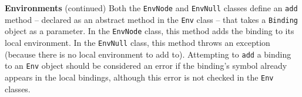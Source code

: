 \begin{minipage}[t]{\sw}
\slidenumber
\LARGE
{\bf Environments} (continued)\exx
Both the \verb'EnvNode' and \verb'EnvNull' classes
define an \verb'add' method --
declared as an abstract method in the \verb'Env' class --
that takes a \verb'Binding' object as a parameter.
In the \verb'EnvNode' class, 
this method adds the binding to its local environment.
In the \verb'EnvNull' class,
this method throws an exception
(because there is no local environment to add to).\exx
Attempting to \verb'add' a binding to an \verb'Env' object
should be considered an error
if the binding's symbol already appears in the local bindings,
although this error is not checked in the \verb'Env' classes.
\end{minipage}
\clearpage
